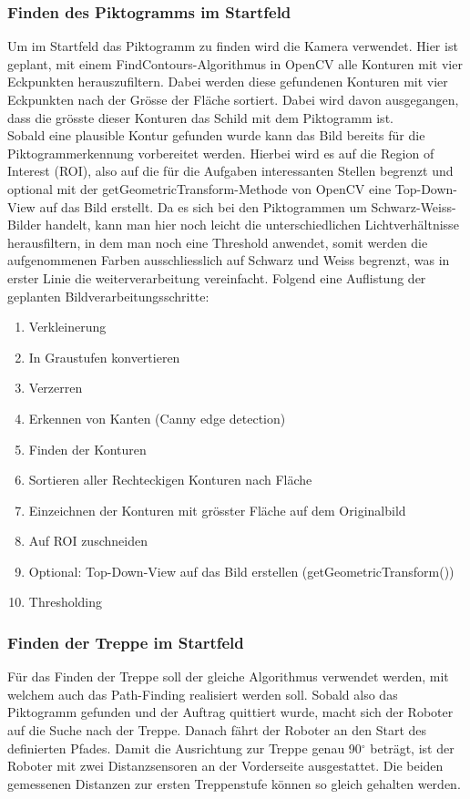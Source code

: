 \subsubsection{Finden des Piktogramms im Startfeld}
\label{sec:piktogramm-finden-im-startfeld}
Um im Startfeld das Piktogramm zu finden wird die Kamera verwendet. Hier ist geplant, mit einem FindContours-Algorithmus \cite{OpenCV-Fining-Contours} in OpenCV alle Konturen mit vier Eckpunkten herauszufiltern. Dabei werden diese gefundenen Konturen mit vier Eckpunkten nach der Grösse der Fläche sortiert. Dabei wird davon ausgegangen, dass die grösste dieser Konturen das Schild mit dem Piktogramm ist.\\ 
Sobald eine plausible Kontur gefunden wurde kann das Bild bereits für die Piktogrammerkennung vorbereitet werden. Hierbei wird es auf die Region of Interest (ROI), also auf die für die Aufgaben interessanten Stellen begrenzt und optional mit der getGeometricTransform-Methode von OpenCV eine Top-Down-View auf das Bild erstellt. Da es sich bei den Piktogrammen um Schwarz-Weiss-Bilder handelt, kann man hier noch leicht die unterschiedlichen Lichtverhältnisse herausfiltern, in dem man noch eine Threshold anwendet, somit werden die aufgenommenen Farben ausschliesslich auf Schwarz und Weiss begrenzt, was in erster Linie die weiterverarbeitung vereinfacht.
Folgend eine Auflistung der geplanten Bildverarbeitungsschritte:
\begin{enumerate}
    \item Verkleinerung
    \item In Graustufen konvertieren 
    \item Verzerren
    \item Erkennen von Kanten (Canny edge detection)
    \item Finden der Konturen
    \item Sortieren aller Rechteckigen Konturen nach Fläche
    \item Einzeichnen der Konturen mit grösster Fläche auf dem Originalbild
    \item Auf ROI zuschneiden
    \item Optional: Top-Down-View auf das Bild erstellen (getGeometricTransform())
    \item Thresholding
\end{enumerate}

\subsubsection{Finden der Treppe im Startfeld}
\label{sec:treppe-finden-im-startfeld}
Für das Finden der Treppe soll der gleiche Algorithmus verwendet werden, mit welchem auch das Path-Finding realisiert werden soll. Sobald also das Piktogramm gefunden und der Auftrag quittiert wurde, macht sich der Roboter auf die Suche nach der Treppe. Danach fährt der Roboter an den Start des definierten Pfades. Damit die Ausrichtung zur Treppe genau 90$^\circ$ beträgt, ist der Roboter mit zwei Distanzsensoren an der Vorderseite ausgestattet. Die beiden gemessenen Distanzen zur ersten Treppenstufe können so gleich gehalten werden.

